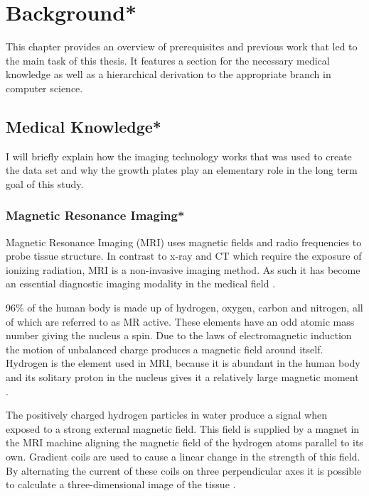 \section{Background*}

This chapter provides an overview of prerequisites and previous work that led to the main task of this thesis. It features a section for the necessary medical knowledge as well as a hierarchical derivation to the appropriate branch in computer science.

\subsection{Medical Knowledge*}

I will briefly explain how the imaging technology works that was used to create the data set and why the growth plates play an elementary role in the long term goal of this study.

\subsubsection{Magnetic Resonance Imaging*}

Magnetic Resonance Imaging (MRI) uses magnetic fields and radio frequencies to probe tissue structure. In contrast to x-ray and CT which require the exposure of ionizing radiation, MRI is a non-invasive imaging method. As such it has become an essential diagnostic imaging modality in the medical field \cite{Westbrook2016}.

96\% of the human body is made up of hydrogen, oxygen, carbon and nitrogen, all of which are referred to as MR active. These elements have an odd atomic mass number giving the nucleus a spin. Due to the laws of electromagnetic induction the motion of unbalanced charge produces a magnetic field around itself. Hydrogen is the element used in MRI, because it is abundant in the human body and its solitary proton in the nucleus gives it a relatively large magnetic moment \cite{Westbrook2016}. 

The positively charged hydrogen particles in water produce a signal when exposed to a strong external magnetic field. This field is supplied by a magnet in the MRI machine aligning the magnetic field of the hydrogen atoms parallel to its own. Gradient coils are used to cause a linear change in the strength of this field. By alternating the current of these coils on three perpendicular axes it is possible to calculate a three-dimensional image of the tissue \cite{Westbrook2016}.

